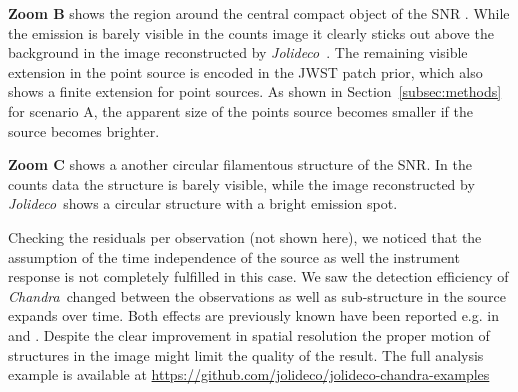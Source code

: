 \documentclass[twocolumn]{aastex631}
\newcommand{\chandra}{\textit{Chandra}~}
\newcommand{\xmm}{\textit{XMM}~}
\newcommand{\jolideco}{\textit{Jolideco}~}
\begin{document}
    \textbf{Zoom B} shows the region around the central compact object of the SNR \cite{Vogt2018}. While the emission is barely visible in the counts image it clearly sticks out above the background in the image reconstructed by \jolideco. The remaining visible extension in the point source is encoded in the JWST patch prior, which also shows a finite extension for point sources. As shown in Section~\ref{subsec:methods} for scenario A, the apparent size of the points source becomes smaller if the source becomes brighter.
    
    \textbf{Zoom C} shows a another circular filamentous structure of the SNR. In the counts data the structure is barely visible, while the image reconstructed by \jolideco shows a circular structure with a bright emission spot. 

    Checking the residuals per observation (not shown here), we noticed that the assumption of the time independence of the source as well the instrument response is not completely fulfilled in this case. We saw the detection efficiency of \chandra changed between the observations as well as sub-structure in the source expands over time. Both effects are previously known have been reported e.g. in \cite{Xi2019} and \cite{}. Despite the clear improvement in spatial resolution the proper motion of structures in the image might limit the quality of the result. The full analysis example is available at \url{https://github.com/jolideco/jolideco-chandra-examples}

        
\end{document}
